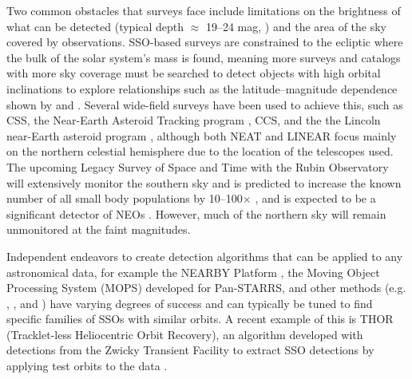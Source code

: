 \documentclass[twocolumn]{aastex62}
\begin{document}
Two common obstacles that surveys face include limitations on the brightness of what can be detected (typical depth $\approx$ 19--24 mag, \citealt{Denneau13}) and the area of the sky covered by observations.  SSO-based surveys are  constrained to the ecliptic where the bulk of the solar system's mass is found, meaning more surveys and catalogs with more sky coverage must be searched to detect objects with high orbital inclinations to explore relationships such as the latitude--magnitude dependence shown by \cite{pena} and \cite{bhattacharya}.  Several wide-field surveys have been used to achieve this, such as CSS, the Near-Earth Asteroid Tracking program \citep[NEAT;][]{Pravdo99}, CCS, and the the Lincoln near-Earth asteroid program \citep[LINEAR; ][]{stokes00}, although both NEAT and LINEAR focus mainly on the northern celestial hemisphere due to the location of the telescopes used.  The upcoming Legacy Survey of Space and Time \citep[LSST;][]{ivezic19} with the Rubin Observatory will extensively monitor the southern sky and is predicted to increase the known number of all small body populations by 10--100$\times$ \citep{jones16}, and is expected to be a significant detector of NEOs \cite{Veres17}.  However, much of the northern sky will remain unmonitored at the faint magnitudes.  

Independent endeavors to create detection algorithms that can be applied to any astronomical data, for example the NEARBY Platform \citep{stefanut19}, the Moving Object Processing System (MOPS) developed for Pan-STARRS, and other methods (e.g. \citealt{lieu19}, \citealt{perdelwitz18}, and \citealt{holman18}) have varying degrees of success and can typically be tuned to find specific families of SSOs with similar orbits.  A recent example of this is THOR (Tracklet-less Heliocentric Orbit Recovery), an algorithm developed with detections from the Zwicky Transient Facility to extract SSO detections by applying test orbits to the data \citep{Moeyens}.  
\end{document}
